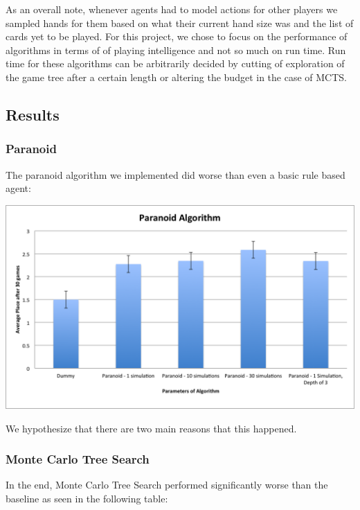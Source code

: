 \documentclass[11pt]{article}
\begin{document}
As an overall note, whenever agents had to model actions for other players we sampled hands for them based on what their current hand size was and the list of cards yet to be played. For this project, we chose to focus on the performance of algorithms in terms of of playing intelligence and not so much on run time. Run time for these algorithms can be arbitrarily decided by cutting of exploration of the game tree after a certain length or altering the budget in the case of MCTS.

\subsection{Results}
 
\subsubsection{Paranoid}

The paranoid algorithm we implemented did worse than even a basic rule based agent:

\begin{center}
\includegraphics[width=\textwidth]{Paranoid.png}
\end{center}

We hypothesize that there are two main reasons that this happened.

\subsubsection{Monte Carlo Tree Search}

In the end, Monte Carlo Tree Search performed significantly worse than the baseline as seen in the following table:
\end{document}
